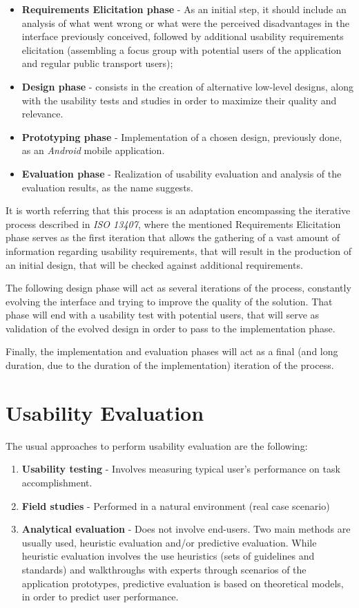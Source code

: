 \begin{itemize}
\item \textbf{Requirements Elicitation phase} - As an initial step, it should include an analysis of what went wrong or what were the perceived disadvantages in the interface previously conceived, followed by additional usability requirements elicitation (assembling a focus group with potential users of the application and regular public transport users);
\item \textbf{Design phase} - consists in the creation of alternative low-level designs, along with the usability tests and studies in order to maximize their quality and relevance.
\item \textbf{Prototyping phase} - Implementation of a chosen design, previously done, as an \emph{Android} mobile application.
\item \textbf{Evaluation phase} - Realization of usability evaluation and analysis of the evaluation results, as the name suggests.
\end{itemize}

It is worth referring that this process is an adaptation encompassing the iterative process described in \emph{ISO 13407}, where the mentioned Requirements Elicitation phase serves as the first iteration that allows the gathering of a vast amount of information regarding usability requirements, that will result in the production of an initial design, that will be checked against additional requirements.

The following design phase will act as several iterations of the process, constantly evolving the interface and trying to improve the quality of the solution. That phase will end with a usability test with potential users, that will serve as validation of the evolved design in order to pass to the implementation phase.

Finally, the implementation and evaluation phases will act as a final (and long duration, due to the duration of the implementation) iteration of the process. 

\section{Usability Evaluation}

The usual approaches to perform usability evaluation are the following:

\begin{enumerate}
\item \textbf{Usability testing} - Involves measuring typical user's performance on task accomplishment.
\item \textbf{Field studies} - Performed in a natural environment (real case scenario)
\item \textbf{Analytical evaluation} - Does not involve end-users. Two main methods are usually used, heuristic evaluation and/or predictive evaluation. While heuristic evaluation involves the use heuristics (sets of guidelines and standards) and walkthroughs with experts through scenarios of the application prototypes, predictive evaluation is based on theoretical models, in order to predict user performance.
\end{enumerate}

